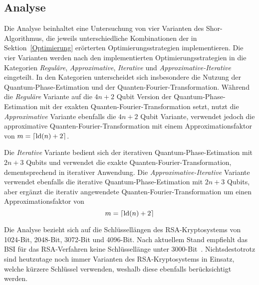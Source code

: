 \subsection*{Analyse}
Die Analyse beinhaltet eine Untersuchung von vier Varianten des Shor-Algorithmus, 
die jeweils unterschiedliche Kombinationen der in Sektion~\ref{Optimierung} erörterten Optimierungsstrategien implementieren.
Die vier Varianten werden nach den implementierten Optimierungsstrategien in die Kategorien \textit{Reguläre}, 
\textit{Approximative}, \textit{Iterative} und \textit{Approximative-Iterative} eingeteilt.
In den Kategorien unterscheidet sich insbesondere die Nutzung der Quantum-Phase-Estimation und der Quanten-Fourier-Transformation. 
Während die \textit{Reguläre} Variante auf die \(4n+2\) Qubit Version der Quantum-Phase-Estimation mit der exakten Quanten-Fourier-Transformation setzt, 
nutzt die \textit{Approximative} Variante ebenfalls die \(4n+2\) Qubit Variante, 
verwendet jedoch die approximative Quanten-Fourier-Transformation mit einem Approximationsfaktor von \(m = \lceil\operatorname{ld}(n)+2\rceil\).

Die \textit{Iterative} Variante bedient sich der iterativen Quantum-Phase-Estimation mit \(2n+3\) Qubits und 
verwendet die exakte Quanten-Fourier-Transformation, dementsprechend in iterativer Anwendung.
Die \textit{Approximative-Iterative} Variante verwendet ebenfalls die iterative Quantum-Phase-Estimation mit \(2n+3\) Qubits, 
aber ergänzt die iterativ angewendete Quanten-Fourier-Transformation um einen Approximationsfaktor von 
\[m = \lceil\operatorname{ld}(n)+2\rceil\]

Die Analyse bezieht sich auf die Schlüssellängen des RSA-Kryptosystems von 1024-Bit, 2048-Bit, 3072-Bit und 4096-Bit. 
Nach aktuellem Stand empfiehlt das BSI für das RSA-Verfahren keine Schlüssellänge unter 3000-Bit~\cite[41]{BSI2023}. 
Nichtsdestotrotz sind heutzutage noch immer Varianten des RSA-Kryptosystems in Einsatz, welche kürzere Schlüssel verwenden, 
weshalb diese ebenfalls berücksichtigt werden.

\bigskip

